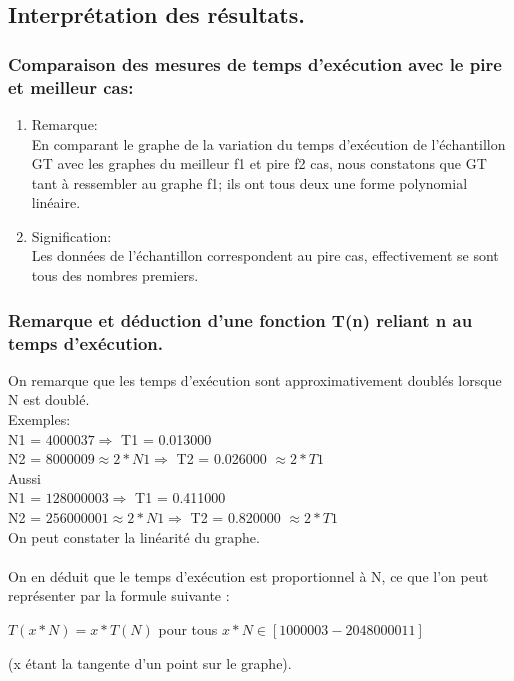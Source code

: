 \documentclass[12pt]{article}
\begin{document}
\subsection{Interprétation des résultats.}
\subsubsection{Comparaison des mesures de temps d'exécution avec le pire et meilleur cas:}
\begin{enumerate}
	\item Remarque: \\
	En comparant le graphe de la variation du temps d'exécution de l'échantillon GT avec les graphes du meilleur f1 et pire f2 cas, nous constatons que GT tant à ressembler au graphe f1; ils ont tous deux une forme polynomial linéaire.
	\\
	  

	\item Signification:
	\\
	Les données de l'échantillon correspondent au pire cas, effectivement se sont tous des nombres premiers.
	

\end{enumerate}

\subsubsection{Remarque et déduction d'une fonction T(n) reliant n au temps d'exécution.}

On remarque que les temps d'exécution sont approximativement doublés lorsque N est doublé.
\\

\color{blue}
Exemples:
\color{black} 
\\
N1 = $4000037  \Rightarrow  $  T1 = 0.013000
\\
N2 = $8000009 \approx 2 * N1  \Rightarrow  $  T2 = 0.026000 $\approx 2 * T1 $
\\

Aussi
\\
N1 = $128000003 \Rightarrow $  T1 = 0.411000
\\
N2 = $256000001 \approx 2 * N1 \Rightarrow $  T2 = 0.820000 $\approx 2 * T1 $
\\

On peut constater la linéarité du graphe. 
\\
\\
On en déduit que le temps d'exécution est proportionnel à N, ce que l'on peut représenter par la formule suivante
: 
\begin{center}
\color{blue}
	$T(x*N) = x*T(N)$ pour tous $ x*N \in [1000003 - 2048000011] $	
	
\color{black}
(x étant la tangente d'un point sur le graphe).
\end{center}
\end{document}
